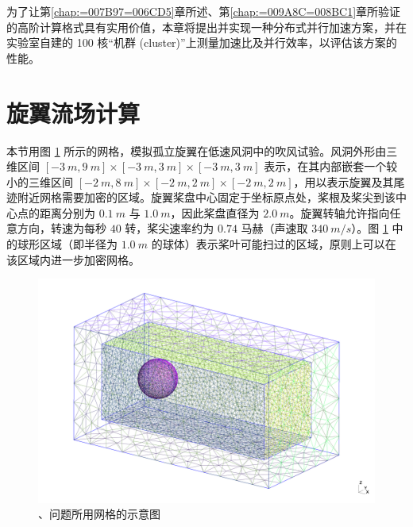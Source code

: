 为了让第\ref{chap:=007B97=006CD5}章所述、第\ref{chap:=009A8C=008BC1}章所验证的高阶计算格式具有实用价值，本章将提出并实现一种分布式并行加速方案，并在实验室自建的
100 核“机群 (cluster)”上测量加速比及并行效率，以评估该方案的性能。

\section{旋翼流场计算\label{sec:rotor_in_tunnel}}

本节用图 \ref{fig:rotor_mesh} 所示的网格，模拟孤立旋翼在低速风洞中的吹风试验。风洞外形由三维区间 $[\SI{-3}{m},\SI{9}{m}]\times[\SI{-3}{m},\SI{3}{m}]\times[\SI{-3}{m},\SI{3}{m}]$
表示，在其内部嵌套一个较小的三维区间 $[\SI{-2}{m},\SI{8}{m}]\times[\SI{-2}{m},\SI{2}{m}]\times[\SI{-2}{m},\SI{2}{m}]$，用以表示旋翼及其尾迹附近网格需要加密的区域。旋翼桨盘中心固定于坐标原点处，桨根及桨尖到该中心点的距离分别为
$\SI{0.1}{m}$ 与 $\SI{1.0}{m}$，因此桨盘直径为 $\SI{2.0}{m}$。旋翼转轴允许指向任意方向，转速为每秒
$40$ 转，桨尖速率约为 $0.74$ 马赫（声速取 $\SI{340}{m/s}$）。图 \ref{fig:rotor_mesh}
中的球形区域（即半径为 $\SI{1.0}{m}$ 的球体）表示桨叶可能扫过的区域，原则上可以在该区域内进一步加密网格。

\begin{figure}[h!]
\begin{centering}
\includegraphics[width=1\textwidth,height=0.33\textheight,keepaspectratio]{../mdpi/figures/rotor_in_tunnel/mesh}
\par\end{centering}
\caption{\label{fig:rotor_mesh}、问题所用网格的示意图}
\end{figure}

